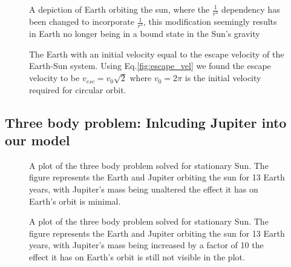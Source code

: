 \documentclass{emulateapj}
\begin{document}
\begin{figure}[t]

\mbox{}

\caption{A depiction of Earth orbiting the sun, where the $\frac{1}{r^{2}}$ dependency has been changed to incorporate $\frac{1}{r^{3}}$, this modification seemingly results in Earth no longer being in a bound state in the Sun's gravity}
\label{fig:beta3}
\end{figure}

\begin{figure}[t]

\mbox{}

\caption{The Earth with an initial velocity equal to the escape velocity of the Earth-Sun system. Using Eq.\eqref{fig:escape_vel} we found the escape velocity to be $v_{esc} = v_{0}\sqrt{2}$ where $v_{0} = 2\pi$ is the initial velocity required for circular orbit.}
\label{fig:escape_vel}
\end{figure}

\subsection{Three body problem: Inlcuding Jupiter into our model}

\begin{figure}[t]

\mbox{}

\caption{A plot of the three body problem solved for stationary Sun. The figure represents the Earth and Jupiter orbiting the sun for 13 Earth years, with Jupiter's mass being unaltered the effect it has on Earth's orbit is minimal.}
\label{fig:Jupiter1}
\end{figure}

\begin{figure}[t]

\mbox{}

\caption{A plot of the three body problem solved for stationary Sun. The figure represents the Earth and Jupiter orbiting the sun for 13 Earth years, with Jupiter's mass being increased by a factor of 10 the effect it has on Earth's orbit is still not visible in the plot.}
\label{fig:Jupiter10}
\end{figure}
\end{document}

